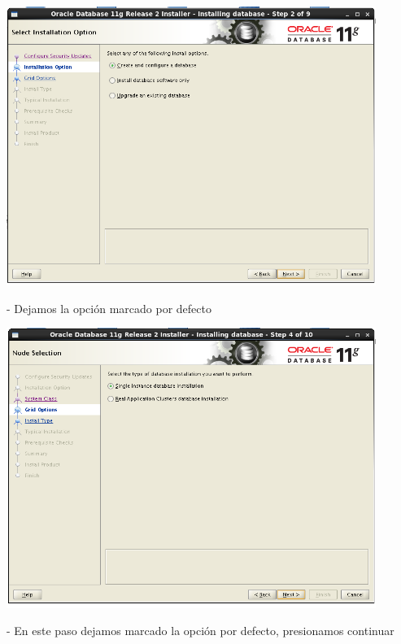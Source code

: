 \documentclass[12pt,letterpaper]{article}
\begin{document}
\begin{center}
	\includegraphics[width=12cm]{./Imagenes/28} 
\end{center}

\begin{itemize}
- Dejamos la opción marcado por defecto \\
\end{itemize}

\begin{center}
	\includegraphics[width=12cm]{./Imagenes/29} 
\end{center}

\begin{itemize}
- En este paso dejamos marcado la opción por defecto, presionamos continuar \\
\end{itemize}
\end{document}
